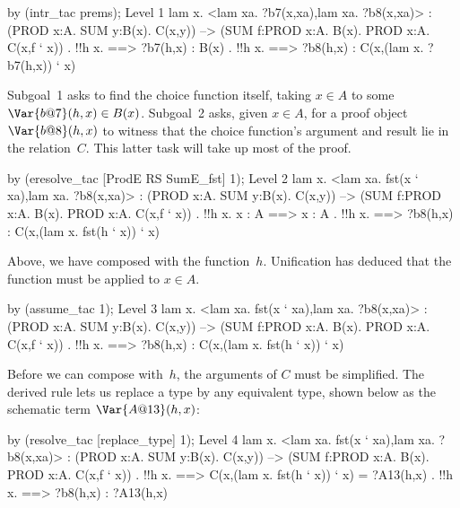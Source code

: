 \begin{ttbox}
by (intr_tac prems);
{\out Level 1}
{\out lam x. <lam xa. ?b7(x,xa),lam xa. ?b8(x,xa)>}
{\out : (PROD x:A. SUM y:B(x). C(x,y)) -->}
{\out   (SUM f:PROD x:A. B(x). PROD x:A. C(x,f ` x))}
\ttbreak
{. !!h x.}
{ ==>}
{\out        ?b7(h,x) : B(x)}
\ttbreak
{. !!h x.}
{ ==>}
{\out        ?b8(h,x) : C(x,(lam x. ?b7(h,x)) ` x)}
\end{ttbox}
Subgoal~1 asks to find the choice function itself, taking $x\in A$ to some
$\Var{b@7}(h,x)\in B(x)$.  Subgoal~2 asks, given $x\in A$, for a proof
object $\Var{b@8}(h,x)$ to witness that the choice function's argument and
result lie in the relation~$C$.  This latter task will take up most of the
proof.
\begin{ttbox}
by (eresolve_tac [ProdE RS SumE_fst] 1);
{\out Level 2}
{\out lam x. <lam xa. fst(x ` xa),lam xa. ?b8(x,xa)>}
{\out : (PROD x:A. SUM y:B(x). C(x,y)) -->}
{\out   (SUM f:PROD x:A. B(x). PROD x:A. C(x,f ` x))}
\ttbreak
{. !!h x. x : A ==> x : A}
{. !!h x.}
{ ==>}
{\out        ?b8(h,x) : C(x,(lam x. fst(h ` x)) ` x)}
\end{ttbox}
Above, we have composed  with the function~$h$.  Unification
has deduced that the function must be applied to $x\in A$.
\begin{ttbox}
by (assume_tac 1);
{\out Level 3}
{\out lam x. <lam xa. fst(x ` xa),lam xa. ?b8(x,xa)>}
{\out : (PROD x:A. SUM y:B(x). C(x,y)) -->}
{\out   (SUM f:PROD x:A. B(x). PROD x:A. C(x,f ` x))}
{. !!h x.}
{ ==>}
{\out        ?b8(h,x) : C(x,(lam x. fst(h ` x)) ` x)}
\end{ttbox}
Before we can compose  with~$h$, the arguments of $C$ must be
simplified.  The derived rule  lets us replace a type
by any equivalent type, shown below as the schematic term $\Var{A@{13}}(h,x)$:
\begin{ttbox}
by (resolve_tac [replace_type] 1);
{\out Level 4}
{\out lam x. <lam xa. fst(x ` xa),lam xa. ?b8(x,xa)>}
{\out : (PROD x:A. SUM y:B(x). C(x,y)) -->}
{\out   (SUM f:PROD x:A. B(x). PROD x:A. C(x,f ` x))}
\ttbreak
{. !!h x.}
{ ==>}
{\out        C(x,(lam x. fst(h ` x)) ` x) = ?A13(h,x)}
\ttbreak
{. !!h x.}
{ ==>}
{\out        ?b8(h,x) : ?A13(h,x)}
\end{ttbox}

